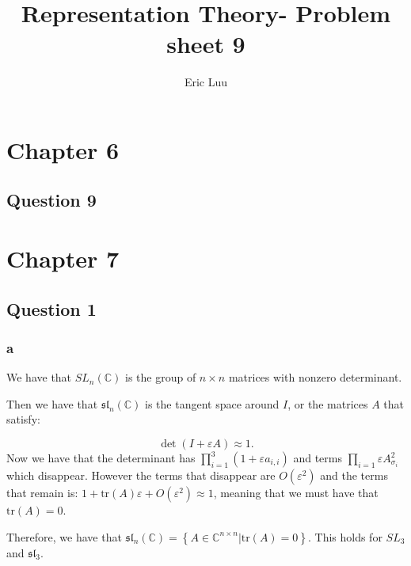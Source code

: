 \documentclass[]{article}
\title{Representation Theory- Problem sheet 9}
\author{Eric Luu}
\newcommand{\tr}{\text{tr}}
\begin{document}
\maketitle

\section*{Chapter 6}
\subsection*{Question 9}

\section*{Chapter 7}
\subsection*{Question 1}

\subsubsection*{a}
We have that $SL_n(\mathbb{C})$ is the group of $n \times n$ matrices with nonzero determinant. 

Then we have that $\mathfrak{sl}_n(\mathbb{C})$ is the tangent space around $I$, or the matrices $A$ that satisfy:

\begin{equation}
	\det \left(I + \varepsilon A\right) \approx 1.
\end{equation}
Now we have that the determinant has $\prod_{i = 1}^3 ( 1 + \varepsilon a_{i,i})$ and terms $\prod_{i = 1} \varepsilon A_{\sigma_i}^2$ which disappear. However the terms that disappear are $O(\varepsilon^2)$ and the terms that remain is: $1 + \tr(A) \varepsilon + O(\varepsilon^2) \approx 1$, meaning that we must have that $\tr(A) = 0$. 

Therefore, we have that $\mathfrak{sl}_n(\mathbb{C}) = \left\{A \in \mathbb{C}^{n \times n} | \tr(A) = 0\right\}$.
This holds for $SL_3$ and $\mathfrak{sl}_3$. 
\end{document}
